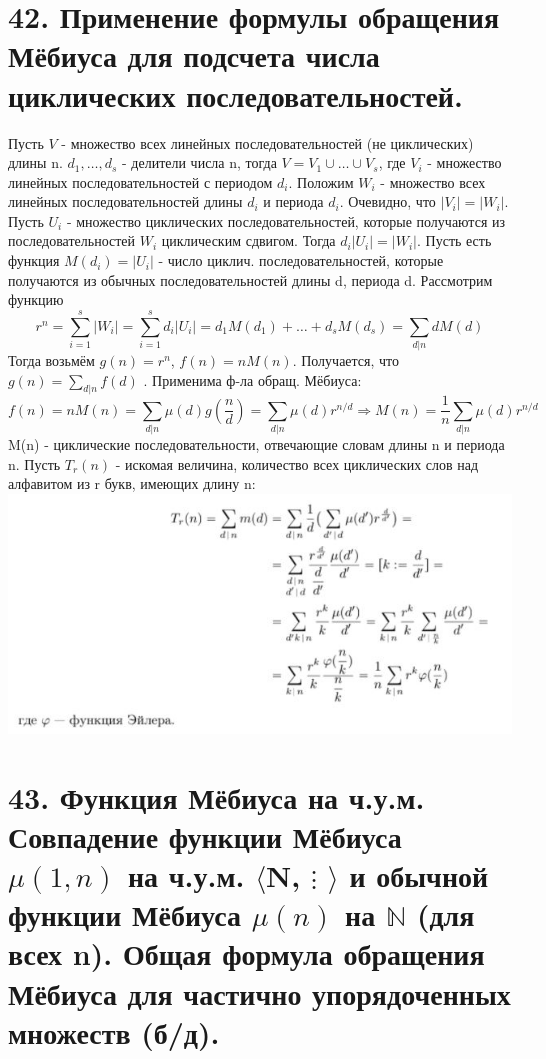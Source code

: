 \section*{42. Применение формулы обращения Мёбиуса для подсчета числа циклических последовательностей.}

Пусть $V$ - множество всех линейных последовательностей (не циклических) длины n. $d_1, \dots, d_s$ - делители числа n, тогда $V = V_1 \cup \dots \cup V_s$, где $V_i$ - множество линейных последовательностей с периодом $d_i$. Положим $W_i$ - множество всех линейных последовательностей длины $d_i$ и периода $d_i$. Очевидно, что $|V_i| = |W_i|$. Пусть $U_i$ - множество циклических последовательностей, которые получаются из последовательностей $W_i$ циклическим сдвигом. Тогда $d_i|U_i| = |W_i|$. Пусть есть функция $M(d_i) = |U_i|$ - число циклич. последовательностей, которые получаются из обычных последовательностей длины d, периода d. Рассмотрим функцию \[r^n =  \sum_{i=1}^s |W_i| = \sum_{i=1}^s d_i|U_i| = d_1M(d_1) + \dots + d_sM(d_s) = \sum_{d|n} dM(d)\]
Тогда возьмём $g(n) = r^n$, $f(n) = nM(n)$. Получается, что $g(n) = \sum_{d|n}f(d)$ . Применима ф-ла обращ. Мёбиуса: \[f(n) = nM(n) = \sum_{d|n} \mu (d)g(\frac{n}{d}) =   \sum_{d|n} \mu (d) r^{n/d} \Rightarrow  M(n) = \frac{1}{n} \sum_{d|n} \mu (d) r^{n/d}\]
M(n) - циклические последовательности, отвечающие словам длины n и периода n. Пусть $T_r(n)$ - искомая величина, количество всех циклических слов над алфавитом из r букв, имеющих длину n: \\
\includegraphics{images/42}

\section*{43. Функция Мёбиуса на ч.у.м. Совпадение функции Мёбиуса $\mu(1, n)$ на ч.у.м. $\langle$N, $\vdots$ $\rangle$ и обычной функции Мёбиуса $\mu(n)$ на $ \mathbb{N}$ (для всех n). Общая формула обращения Мёбиуса для частично упорядоченных множеств (б/д).}


